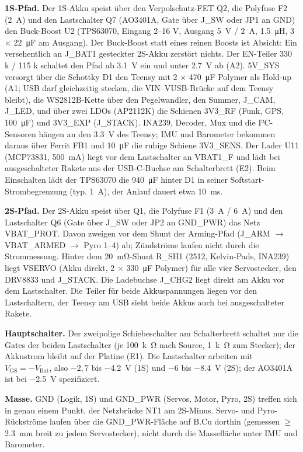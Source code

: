\documentclass[10pt,a4paper,twoside]{article}
\begin{document}
\textbf{1S-Pfad.} Der 1S-Akku speist über den Verpolschutz-FET Q2, die Polyfuse F2 (\SI{2}{A}) und den Lastschalter Q7 (AO3401A, Gate über J\_SW oder JP1 an GND) den Buck-Boost U2 (TPS63070, Eingang 2--16 V, Ausgang \SI{5}{V} / \SI{2}{A}, \SI{1.5}{\micro H}, 3 × \SI{22}{\micro F} am Ausgang). Der Buck-Boost statt eines reinen Boosts ist Absicht: Ein versehentlich an J\_BAT1 gesteckter 2S-Akku zerstört nichts. Der EN-Teiler 330 k / 115 k schaltet den Pfad ab \SI{3.1}{V} ein und unter \SI{2.7}{V} ab (A2). 5V\_SYS versorgt über die Schottky D1 den Teensy mit 2 × \SI{470}{\micro F} Polymer als Hold-up (A1; USB darf gleichzeitig stecken, die VIN--VUSB-Brücke auf dem Teensy bleibt), die WS2812B-Kette über den Pegelwandler, den Summer, J\_CAM, J\_LED, und über zwei LDOs (AP2112K) die Schienen 3V3\_RF (Funk, GPS, \SI{100}{\micro F}) und 3V3\_EXP (J\_STACK). INA239, Decoder, Mux und die I²C-Sensoren hängen an den \SI{3.3}{V} des Teensy; IMU und Barometer bekommen daraus über Ferrit FB1 und \SI{10}{\micro F} die ruhige Schiene 3V3\_SENS. Der Lader U11 (MCP73831, \SI{500}{mA}) liegt vor dem Lastschalter an VBAT1\_F und lädt bei ausgeschalteter Rakete aus der USB-C-Buchse am Schalterbrett (E2). Beim Einschalten lädt der TPS63070 die \SI{940}{\micro F} hinter D1 in seiner Softstart-Strombegrenzung (typ. \SI{1}{A}), der Anlauf dauert etwa \SI{10}{ms}.

\textbf{2S-Pfad.} Der 2S-Akku speist über Q1, die Polyfuse F1 (\SI{3}{A} / \SI{6}{A}) und den Lastschalter Q6 (Gate über J\_SW oder JP2 an GND\_PWR) das Netz VBAT\_PROT. Davon zweigen vor dem Shunt der Arming-Pfad (J\_ARM $\to$ VBAT\_ARMED $\to$ Pyro 1--4) ab; Zündströme laufen nicht durch die Strommessung. Hinter dem \SI{20}{\milli\ohm}-Shunt R\_SH1 (2512, Kelvin-Pads, INA239) liegt VSERVO (Akku direkt, 2 × \SI{330}{\micro F} Polymer) für alle vier Servostecker, den DRV8833 und J\_STACK. Die Ladebuchse J\_CHG2 liegt direkt am Akku vor dem Lastschalter. Die Teiler für beide Akkuspannungen liegen vor den Lastschaltern, der Teensy am USB sieht beide Akkus auch bei ausgeschalteter Rakete.

\textbf{Hauptschalter.} Der zweipolige Schiebeschalter am Schalterbrett schaltet nur die Gates der beiden Lastschalter (je \SI{100}{k\ohm} nach Source, \SI{1}{k\ohm} zum Stecker); der Akkustrom bleibt auf der Platine (E1). Die Lastschalter arbeiten mit $V_{\mathrm{GS}} = -V_{\mathrm{Bat}}$, also $-2{,}7$ bis \SI{-4.2}{V} (1S) und $-6$ bis \SI{-8.4}{V} (2S); der AO3401A ist bei \SI{-2.5}{V} spezifiziert.

\textbf{Masse.} GND (Logik, 1S) und GND\_PWR (Servos, Motor, Pyro, 2S) treffen sich in genau einem Punkt, der Netzbrücke NT1 am 2S-Minus. Servo- und Pyro-Rückströme laufen über die GND\_PWR-Fläche auf B.Cu dorthin (gemessen $\ge$ \SI{2.3}{mm} breit zu jedem Servostecker), nicht durch die Massefläche unter IMU und Barometer.
\end{document}
